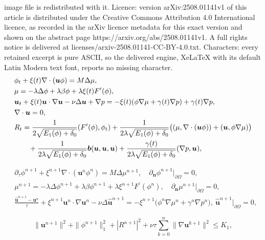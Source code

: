 \documentclass[10pt,a4paper]{amsart}
\newcommand{\p}{\partial}
\begin{document}
image file is redistributed with it. Licence: version arXiv:2508.01141v1 of this article is distributed under the Creative Commons Attribution 4.0 International licence, as recorded in the arXiv licence metadata for this exact version and shown on the abstract page https://arxiv.org/abs/2508.01141v1. A full rights notice is delivered at licenses/arxiv-2508.01141-CC-BY-4.0.txt. Characters: every retained excerpt is pure ASCII, so the delivered engine, XeLaTeX with its default Latin Modern text font, reports no missing character.
\begin{align}
	& \phi_t+ \xi(t) \nabla \cdot (\bm u \phi) =M \Delta \mu,  \label{model:sav:phi} \\
	& \mu=- \lambda\Delta \phi +\lambda  \beta \phi+ \lambda \xi(t) F^{\prime}(\phi),  \label{model:sav:mu}\\
	& \bm u_t +  \xi(t) \bm u\cdot\nabla \bm u-\nu \Delta \bm u +\nabla p=-  \xi(t) (\phi \nabla \mu + \gamma(t) \nabla p) + \gamma(t)  \nabla p,  \label{model:sav:u}\\
	& \nabla \cdot \bm u = 0,    \label{model:sav:divu} \\
	&  R_t =\frac{1}{2  \sqrt{E_1(\phi)+\delta_0}}   ( F^{\prime}(\phi), \phi_t)
	+  \frac{1}{2 \lambda  \sqrt{E_1(\phi)+\delta_0}} \big((\mu , \nabla \cdot (\bm u \phi) )+  ( {\bm u} ,  \phi  \nabla\mu ) \big) \notag\\
	&\qquad  + \frac{1}{2 \lambda  \sqrt{E_1(\phi)+\delta_0}} \bm b(\bm u, \bm u, \bm u) + \frac{ \gamma(t)}{2 \lambda  \sqrt{E_1(\phi)+\delta_0}}  (\nabla p, \bm u), 
	\label{model:sav:r}
\end{align}

\begin{align}
	& \p_{\tau} \phi^{n+1} + \xi^{n+1}\nabla \cdot({\bm u}^n \phi^n  )=M \Delta \mu^{n+1}, \quad  
	\p_{\bm n} \phi^{n+1}|_{\partial \Omega}=0, \label{scheme:1th:phi}\\
	& \mu^{n+1}=- \lambda \Delta \phi^{n+1} + \lambda \beta \phi^{n+1} + \lambda  \xi^{n+1} F^{\prime}(\phi^n), \quad   
	\p_{\bm n} \mu^{n+1} |_{\partial \Omega}=0, \label{scheme:1th:mu} \\
	& \frac{\widehat {\bm u}^{n+1} -  \bm u^n}{\tau} + \xi^{n+1} {\bm u}^n\cdot\nabla {\bm u}^n - \nu\Delta   \widehat {\bm u}^{n+1} = -\xi^{n+1}  \big( \phi^n \nabla \mu^n+\gamma^n \nabla p^n \big), ~
	\widehat{\bm u}^{n+1}|_{\partial \Omega}=0, \label{scheme:1th:uhat}   
\end{align}

	\begin{equation} \label{bound:solu}
		\|\bm u^{n+1}\|^2 +\|\phi^{n+1}\|_1^2 +|R^{n+1}|^2  +   {\nu \tau\sum_{k=0}^n\|\nabla {\bm u}^{k+1} \|^2}\leq K_1,
	\end{equation}
\end{document}
